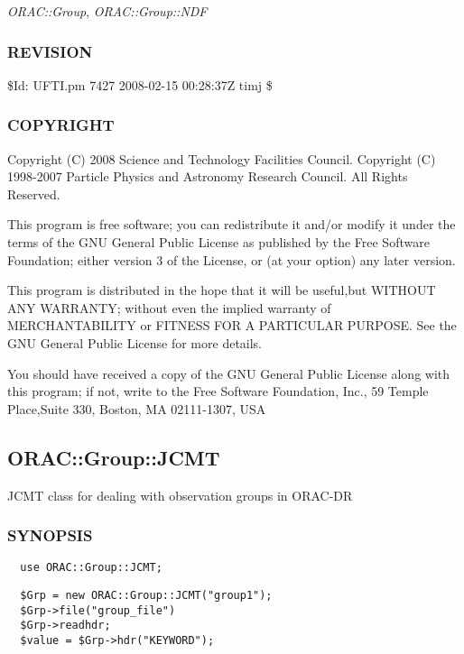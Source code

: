 \begin{description}
\emph{ORAC::Group}, \emph{ORAC::Group::NDF}

\subsubsection*{REVISION\label{ORAC::Group::UFTI_REVISION}}


\$Id: UFTI.pm 7427 2008-02-15 00:28:37Z timj \$

\subsubsection*{COPYRIGHT\label{ORAC::Group::UFTI_COPYRIGHT}}


Copyright (C) 2008 Science and Technology Facilities Council.
Copyright (C) 1998-2007 Particle Physics and Astronomy Research
Council. All Rights Reserved.



This program is free software; you can redistribute it and/or modify it under
the terms of the GNU General Public License as published by the Free Software
Foundation; either version 3 of the License, or (at your option) any later
version.



This program is distributed in the hope that it will be useful,but WITHOUT ANY
WARRANTY; without even the implied warranty of MERCHANTABILITY or FITNESS FOR A
PARTICULAR PURPOSE. See the GNU General Public License for more details.



You should have received a copy of the GNU General Public License along with
this program; if not, write to the Free Software Foundation, Inc., 59 Temple
Place,Suite 330, Boston, MA  02111-1307, USA

\subsection{ORAC::Group::JCMT\label{ORAC::Group::JCMT}}


JCMT class for dealing with observation groups in ORAC-DR

\subsubsection*{SYNOPSIS\label{ORAC::Group::JCMT_SYNOPSIS}}
\begin{verbatim}
  use ORAC::Group::JCMT;
\end{verbatim}
\begin{verbatim}
  $Grp = new ORAC::Group::JCMT("group1");
  $Grp->file("group_file")
  $Grp->readhdr;
  $value = $Grp->hdr("KEYWORD");
\end{verbatim}

\end{description}
